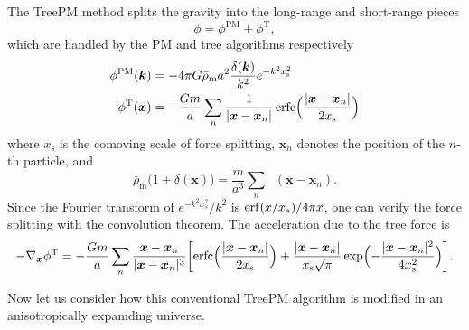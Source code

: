 \documentclass[a4paper,11pt]{article}
\DeclareMathOperator{\deltaD}{\delta^\mathrm{D}}
\DeclareMathOperator{\erfc}{erfc}
\newcommand{\vx}{{\bm x}}
\newcommand{\vk}{{\bm k}}
\newcommand{\rhobarm}{{\bar\rho_\mathrm{m}}}
\newcommand{\Tree}{\mathrm{T}}
\newcommand{\PM}{\mathrm{PM}}
\newcommand{\xs}{x_\mathrm{s}}
\begin{document}
The TreePM method splits the gravity into the long-range and short-range pieces
\begin{equation}
    \phi = \phi^\PM + \phi^\Tree,
\end{equation}
which are handled by the PM and tree algorithms respectively \cite{Bagla02,
BaglaRay03}
\begin{align}
    \phi^\PM(\vk) &= - 4\pi G \rhobarm a^2
        \frac{\delta(\vk)}{k^2} e^{- k^2 \xs^2} \\
    \phi^\Tree(\vx) &= - \frac{G m}a \sum_n \frac1{|\vx-\vx_n|}
    \erfc \Bigl( \frac{|\vx-\vx_n|}{2 \xs} \Bigr)
\end{align}
where $\xs$ is the comoving scale of force splitting,
$\vx_n$ denotes the position of the $n$-th particle,
and
\begin{equation}
    \rhobarm \bigl( 1 + \delta(\vx) \bigr)
    = \frac{m}{a^3} \sum_n \deltaD(\vx-\vx_n).
\end{equation}
Since the Fourier transform of $e^{- k^2 x_s^2} / k^2$ is ${\rm erf}(x / x_s) / 4\pi x$,
one can verify the force splitting with the convolution theorem.
The acceleration due to the tree force is
\begin{equation}
    - \nabla_\vx \phi^\Tree = - \frac{G m}a \sum_n
    \frac{\vx - \vx_n}{|\vx - \vx_n|^3}
    \biggl[ \erfc \Bigl( \frac{|\vx - \vx_n|}{2 \xs} \Bigr)
            + \frac{|\vx - \vx_n|}{\xs \sqrt\pi}
            \exp \Bigl( - \frac{|\vx - \vx_n|^2}{4 \xs^2} \Bigr) \biggr].
\end{equation}

Now let us consider how this conventional TreePM algorithm is modified
in an anisotropically expamding universe.
\end{document}
